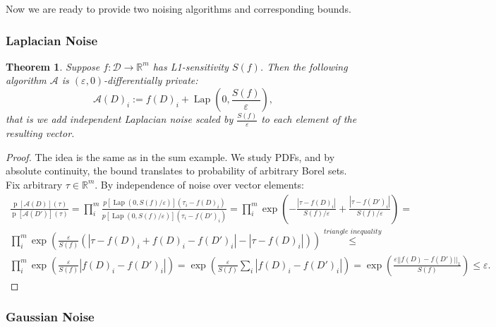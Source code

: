 \documentclass[12pt,letterpaper]{article}
\newcommand{\R}{\mathbb{R}}
\let\eps\varepsilon
\newcommand{\p}{\operatorname{p}}
\newtheorem{theorem}{Theorem}
\newtheorem{remark}{Remark}
\newcommand{\Lap}{\operatorname{Lap}}
\begin{document}

Now we are ready to provide two noising algorithms and corresponding bounds.

\subsubsection{Laplacian Noise}

\begin{theorem}
  \label{thm:laplacian}
Suppose $f: \mathcal{D} \to \R^m$ has L1-sensitivity $S(f)$. Then the following algorithm $\mathcal{A}$ is $(\eps, 0)$-differentially private:
$$\mathcal{A}(D)_i := f(D)_i + \operatorname{Lap}(0, \frac{S(f)}{\eps}),$$
that is we add independent Laplacian noise scaled by $\frac{S(f)}{\eps}$ to each element of the resulting vector.
\end{theorem}
\begin{proof}
  The idea is the same as in the sum example. We study PDFs, and by absolute continuity, the bound translates to probability of arbitrary Borel sets. Fix arbitrary $\tau \in \R^m$. By independence of noise over vector elements:
  \begin{multline*}
    \frac{\p[\mathcal{A}(D)](\tau)}{\p[\mathcal{A}(D')](\tau)} = 
    \prod_{i}^m \frac{p[\Lap(0, S(f) / \eps)](\tau_i - f(D)_i)}{p[\Lap(0, S(f) / \eps)](\tau_i - f(D')_i)} = 
    \prod_{i}^m \exp\left(-\frac{|\tau - f(D)_i|}{S(f)/\eps} + \frac{|\tau - f(D')_i|}{S(f)/\eps}\right) = \\
    \prod_{i}^m \exp\left(\frac{\eps}{S(f)}(|\tau - f(D)_i + f(D)_i - f(D')_i| - |\tau - f(D)_i|)\right) \overset{\textit{triangle inequality}}{\leq} \\
    \prod_{i}^m \exp\left(\frac{\eps}{S(f)}|f(D)_i - f(D')_i|\right) = \exp\left(\frac{\eps}{S(f)} \sum_i |f(D)_i - f(D')_i|\right) = \exp\left(\frac{\eps ||f(D) - f(D')||_1}{S(f)}\right) \leq \eps.
    \end{multline*}
\end{proof}

\subsubsection{Gaussian Noise}
\end{document}
